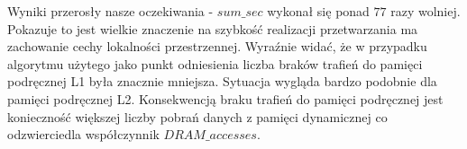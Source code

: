 Wyniki przerosły nasze oczekiwania - $sum\_sec$ wykonał się ponad $77$ razy wolniej. Pokazuje to jest wielkie znaczenie na szybkość realizacji przetwarzania ma zachowanie cechy lokalności przestrzennej. Wyraźnie widać, że w przypadku algorytmu użytego jako punkt odniesienia liczba braków trafień do pamięci podręcznej L1 była znacznie mniejsza. Sytuacja wygląda bardzo podobnie dla pamięci podręcznej L2. Konsekwencją braku trafień do pamięci podręcznej jest konieczność większej liczby pobrań danych z pamięci dynamicznej co odzwierciedla współczynnik $DRAM\_accesses$.
